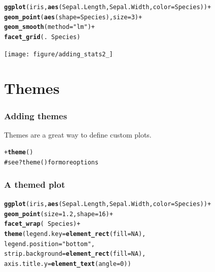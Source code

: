 \documentclass{beamer}\usepackage{graphicx, color}
\makeatletter
\newcommand{\hlfunctioncall}[1]{\textcolor[rgb]{0.501960784313725,0,0.329411764705882}{\textbf{#1}}}%
\newcommand{\hlstring}[1]{\textcolor[rgb]{0.6,0.6,1}{#1}}%
\newcommand{\hlcomment}[1]{\textcolor[rgb]{0.180392156862745,0.6,0.341176470588235}{#1}}%
\newenvironment{kframe}{%
 \def\at@end@of@kframe{}%
 \ifinner\ifhmode%
  \def\at@end@of@kframe{\end{minipage}}%
  \begin{minipage}{\columnwidth}%
 \fi\fi%
 \def\FrameCommand##1{\hskip\@totalleftmargin \hskip-\fboxsep
 \colorbox{shadecolor}{##1}\hskip-\fboxsep
     \hskip-\linewidth \hskip-\@totalleftmargin \hskip\columnwidth}%
 \MakeFramed {\advance\hsize-\width
   \@totalleftmargin\z@ \linewidth\hsize
   \@setminipage}}%
 {\par\unskip\endMakeFramed%
 \at@end@of@kframe}
\newenvironment{knitrout}{}{} %
\makeatother
\begin{document}
\begin{frame}[fragile]
\begin{knitrout}\footnotesize
{}\color{fgcolor}\begin{kframe}
\begin{alltt}
\hlfunctioncall{ggplot}(iris, \hlfunctioncall{aes}(Sepal.Length, Sepal.Width, color = Species)) +
\hlfunctioncall{geom_point}(\hlfunctioncall{aes}(shape = Species), size = 3) +
\hlfunctioncall{geom_smooth}(method = \hlstring{"lm"}) +
\hlfunctioncall{facet_grid}(. ~ Species)
\end{alltt}
\end{kframe}
\texttt{[image: figure/adding\_stats2\_]} 

\end{knitrout}

\end{frame}

\section*{Themes}
\frame{\sectionpage}

\begin{frame}[fragile]
\frametitle{Adding themes}
Themes are a great way to define custom plots.
\begin{knitrout}\footnotesize
{}\color{fgcolor}\begin{kframe}
\begin{alltt}
+\hlfunctioncall{theme}()
\hlcomment{# see ?theme() for more options}
\end{alltt}
\end{kframe}
\end{knitrout}


\end{frame}


\begin{frame}[fragile]
\frametitle{A themed plot}
\begin{knitrout}\footnotesize
{}\color{fgcolor}\begin{kframe}
\begin{alltt}
\hlfunctioncall{ggplot}(iris, \hlfunctioncall{aes}(Sepal.Length, Sepal.Width, color = Species)) +
\hlfunctioncall{geom_point}(size = 1.2, shape = 16) +
\hlfunctioncall{facet_wrap}( ~ Species) +
\hlfunctioncall{theme}(legend.key = \hlfunctioncall{element_rect}(fill = NA),
legend.position = \hlstring{"bottom"},
strip.background = \hlfunctioncall{element_rect}(fill = NA),
axis.title.y = \hlfunctioncall{element_text}(angle = 0))
\end{alltt}
\end{kframe}
\end{knitrout}

\end{frame}
\end{document}
